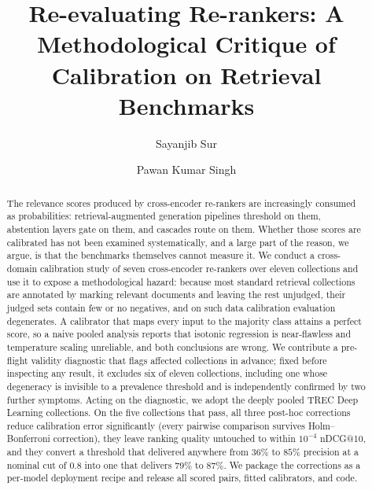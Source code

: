 \documentclass[sigconf,nonacm]{acmart}
\begin{document}
\title{Re-evaluating Re-rankers: A Methodological Critique of Calibration on
Retrieval Benchmarks}

\author{Sayanjib Sur}

\author{Pawan Kumar Singh}

\begin{abstract}
The relevance scores produced by cross-encoder re-rankers are increasingly consumed
as probabilities: retrieval-augmented generation pipelines threshold on them,
abstention layers gate on them, and cascades route on them. Whether those scores are
calibrated has not been examined systematically, and a large part of the reason,
we argue, is that the benchmarks themselves cannot measure it. We conduct a
cross-domain calibration study of seven cross-encoder re-rankers over eleven
collections and use it to expose a methodological hazard: because most standard
retrieval collections are annotated by marking relevant documents and leaving the
rest unjudged, their judged sets contain few or no negatives, and on such data
calibration evaluation degenerates. A calibrator that maps every input to the
majority class attains a perfect score, so a naive pooled analysis reports that
isotonic regression is near-flawless and temperature scaling unreliable, and both
conclusions are wrong. We contribute a pre-flight validity diagnostic that flags
affected collections in advance; fixed before inspecting any result, it excludes six
of eleven collections, including one whose degeneracy is invisible to a prevalence
threshold and is independently confirmed by two further symptoms. Acting on the
diagnostic, we adopt the deeply pooled TREC Deep Learning collections. On the five
collections that pass, all three post-hoc corrections reduce calibration error
significantly (every pairwise comparison survives Holm--Bonferroni correction), they
leave ranking quality untouched to within $10^{-4}$ nDCG@10, and they convert a
threshold that delivered anywhere from $36\%$ to $85\%$ precision at a nominal cut of
$0.8$ into one that delivers $79\%$ to $87\%$. We package the corrections as a
per-model deployment recipe and release all scored pairs, fitted calibrators, and
code.
\end{abstract}
\end{document}
